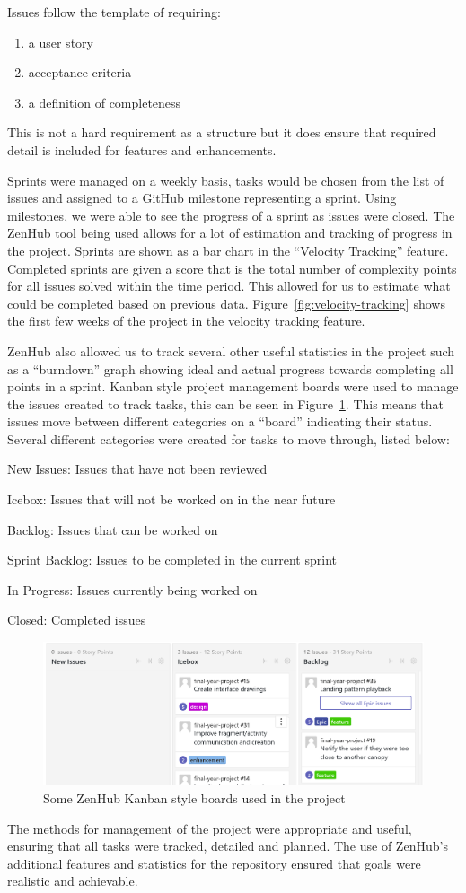 Issues follow the template of requiring:
\begin{enumerate}[noitemsep]
  \item a user story
  \item acceptance criteria
  \item a definition of completeness
\end{enumerate}
This is not a hard requirement as a structure but it does ensure that required detail is included for features and enhancements.


Sprints were managed on a weekly basis, tasks would be chosen from the list of issues and assigned to a GitHub milestone representing a sprint. Using milestones, we were able to see the progress of a sprint as issues were closed.
The ZenHub tool being used allows for a lot of estimation and tracking of progress in the project. Sprints are shown as a bar chart in the ``Velocity Tracking'' feature. Completed sprints are given a score that is the total number of complexity points for all issues solved within the time period. This allowed for us to estimate what could be completed based on previous data. Figure~\ref{fig:velocity-tracking} shows the first few weeks of the project in the velocity tracking feature.

ZenHub also allowed us to track several other useful statistics in the project such as a ``burndown'' graph showing ideal and actual progress towards completing all points in a sprint.
Kanban style project management boards were used to manage the issues created to track tasks, this can be seen in Figure~\ref{fig:kanban-board}. This means that issues move between different categories on a ``board'' indicating their status. Several different categories were created for tasks to move through, listed below:
\begin{description}[noitemsep]
  \item New Issues: Issues that have not been reviewed
  \item Icebox: Issues that will not be worked on in the near future
  \item Backlog: Issues that can be worked on
  \item Sprint Backlog: Issues to be completed in the current sprint
  \item In Progress: Issues currently being worked on
  \item Closed: Completed issues
\end{description}

\begin{figure}[ht]
  \centering
  \includegraphics[width=\linewidth]{img/issue-board.png}
  \caption{Some ZenHub Kanban style boards used in the project}\label{fig:kanban-board}
\end{figure}

The methods for management of the project were appropriate and useful, ensuring that all tasks were tracked, detailed and planned. The use of ZenHub's additional features and statistics for the repository ensured that goals were realistic and achievable.
